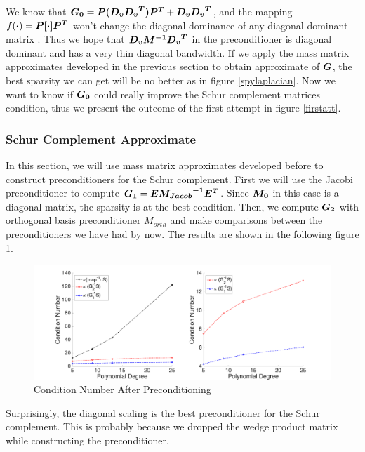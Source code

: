 We know that $\boldsymbol{G_0} = \boldsymbol{P (D_v {D_v}^T )P^T}  + \boldsymbol{D_v {D_v}^T}$, and the mapping $f(\boldsymbol{\cdot}) = \boldsymbol{P[\cdot]P^T}$ won't change the diagonal dominance of any diagonal dominant matrix . Thus we hope that $\boldsymbol{D_v {M}^{-1} {D_v}^T}$ in the preconditioner is diagonal dominant and has a very thin diagonal bandwidth. If we apply the mass matrix approximates developed in the previous section to obtain approximate of $\boldsymbol{G}$, the best sparsity we can get will be no better as in figure \ref{spylaplacian}. Now we want to know if $\boldsymbol{G_0}$ could really improve the Schur complement matrices condition, thus we present the outcome of the first attempt in figure \ref{firstatt}. \\

\subsubsection{Schur Complement Approximate}
In this section, we will use mass matrix approximates developed before to construct preconditioners for the Schur complement. First we will use the Jacobi preconditioner to compute $\boldsymbol{G_1} = \boldsymbol{E {M_{Jacob}}^{-1} {E}^T}$. Since $\boldsymbol{M_0}$ in this case is a diagonal matrix, the sparsity is at the best condition. Then, we compute $\boldsymbol{G_2}$ with orthogonal basis preconditioner $M_{orth}$ and make comparisons between the preconditioners we have had by now. The results are shown in the following figure \ref{schur_pre}.
\begin{figure}[H]
	\centering
	\includegraphics[width =.95\textwidth]{Schur_precond}
	\caption{Condition Number After Preconditioning}
	\label{schur_pre}
\end{figure}
Surprisingly, the diagonal scaling is the best preconditioner for the Schur complement. This is probably because we dropped the wedge product matrix while constructing the preconditioner. 
            








    

 
 
 
 
 
 
 
 
 
  
 


   
        










  